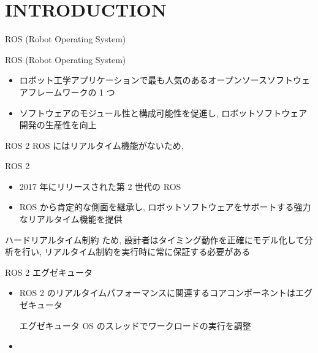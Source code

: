 
\section{INTRODUCTION}
\label{sec: introduction}

\begin{frame}{ROS (Robot Operating System)}
    \begin{block}{ROS (Robot Operating System)}
        \begin{itemize}
            \item ロボット工学アプリケーションで最も人気のあるオープンソースソフトウェアフレームワークの 1 つ
            \item ソフトウェアのモジュール性と構成可能性を促進し, ロボットソフトウェア開発の生産性を向上
        \end{itemize}
    \end{block}
    \vspace{5mm}
\end{frame}

\begin{frame}{ROS 2}
    ROS にはリアルタイム機能がないため, 
    \begin{block}{ROS 2}
        \begin{itemize}
            \item 2017 年にリリースされた第 2 世代の ROS
            \item ROS から肯定的な側面を継承し, ロボットソフトウェアをサポートする強力なリアルタイム機能を提供
        \end{itemize}
    \end{block}
\end{frame}

\begin{frame}{ハードリアルタイム制約}
    ため, 設計者はタイミング動作を正確にモデル化して分析を行い, リアルタイム制約を実行時に常に保証する必要がある
\end{frame}

\begin{frame}{ROS 2 エグゼキュータ}
    \begin{itemize}
        \item ROS 2 のリアルタイムパフォーマンスに関連するコアコンポーネントはエグゼキュータ
        \begin{block}{エグゼキュータ}
            OS のスレッドでワークロードの実行を調整
        \end{block}
        \vspace{5mm}
        \item {}
    \end{itemize}
\end{frame}

